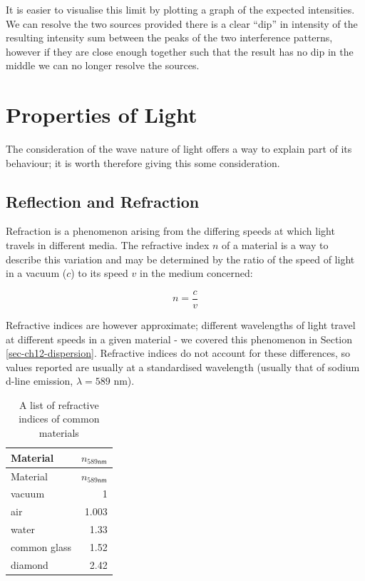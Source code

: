 \documentclass[
]{book}
\begin{document}
It is easier to visualise this limit by plotting a graph of the expected intensities. We can resolve the two sources provided there is a clear ``dip'' in intensity of the resulting intensity sum between the peaks of the two interference patterns, however if they are close enough together such that the result has no dip in the middle we can no longer resolve the sources.

\hypertarget{sec-ch14-propertieslight}{%
\chapter{Properties of Light}\label{sec-ch14-propertieslight}}

The consideration of the wave nature of light offers a way to explain part of its behaviour; it is worth therefore giving this some consideration.

\hypertarget{sec-ch14-reflectionrefraction}{%
\section{Reflection and Refraction}\label{sec-ch14-reflectionrefraction}}

Refraction is a phenomenon arising from the differing speeds at which light travels in different media. The refractive index \(n\) of a material is a way to describe this variation and may be determined by the ratio of the speed of light in a vacuum (\(c\)) to its speed \(v\) in the medium concerned:

\begin{equation}
n = \frac{c}{v}
\end{equation}

Refractive indices are however approximate; different wavelengths of light travel at different speeds in a given material - we covered this phenomenon in Section \ref{sec-ch12-dispersion}. Refractive indices do not account for these differences, so values reported are usually at a standardised wavelength (usually that of sodium d-line emission, \(\lambda = 589\) nm).

\begin{longtable}[]{@{}lr@{}}
\caption{\label{tab:ch14-refractiveindices} A list of refractive indices of common materials}\tabularnewline
\toprule()
Material & \(n_{589 \textsf{nm}}\) \\
\midrule()
\endfirsthead
\toprule()
Material & \(n_{589 \textsf{nm}}\) \\
\midrule()
\endhead
vacuum & 1 \\
air & 1.003 \\
water & 1.33 \\
common glass & 1.52 \\
diamond & 2.42 \\
\bottomrule()
\end{longtable}
\end{document}
